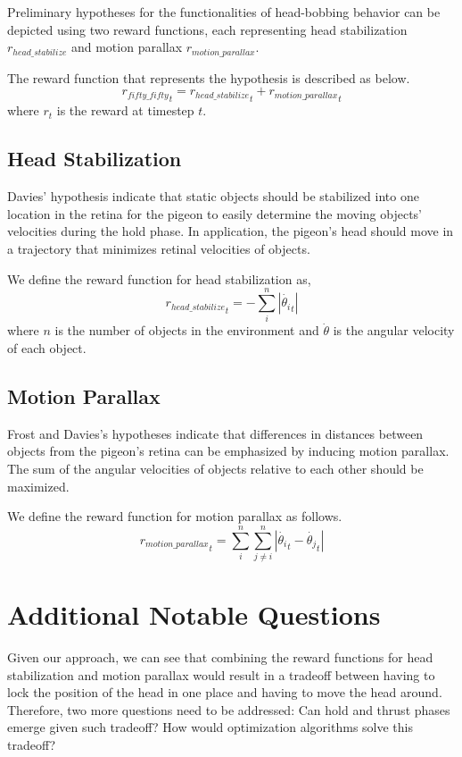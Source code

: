  Preliminary hypotheses for the functionalities of head-bobbing behavior can be depicted using two reward functions, each representing head stabilization ${r_{head\_stabilize}}$ and motion parallax ${r_{motion\_parallax}}$.

  The reward function that represents the hypothesis is described as below.
  \begin{equation}
    {r_{fifty\_fifty}}_t = {r_{head\_stabilize}}_t + {r_{motion\_parallax}}_t
  \end{equation}
  where $r_t$ is the reward at timestep $t$.

  \subsection{Head Stabilization}
    Davies' hypothesis indicate that static objects should be stabilized into one location in the retina for the pigeon to easily determine the moving objects' velocities during the hold phase. In application, the pigeon's head should move in a trajectory that minimizes retinal velocities of objects.

    We define the reward function for head stabilization as,
    \begin{equation}
      {r_{head\_stabilize}}_t = - \sum_i^n |\dot {\theta_i}_t|
    \end{equation}
    where $n$ is the number of objects in the environment and $\dot \theta$ is the angular velocity of each object.

  \subsection{Motion Parallax}
    Frost and Davies's hypotheses indicate that differences in distances between objects from the pigeon's retina can be emphasized by inducing motion parallax.
    The sum of the angular velocities of objects relative to each other should be maximized.

    We define the reward function for motion parallax as follows.
    \begin{equation}
      {r_{motion\_parallax}}_t = \sum_i^n \sum_{j \ne i}^n |\dot {\theta_i}_t - \dot {\theta_j}_t|
    \end{equation}


\section{Additional Notable Questions}
  Given our approach, we can see that combining the reward functions for head stabilization and motion parallax would result in a tradeoff between having to lock the position of the head in one place and having to move the head around. Therefore, two more questions need to be addressed: Can hold and thrust phases emerge given such tradeoff? How would optimization algorithms solve this tradeoff?

